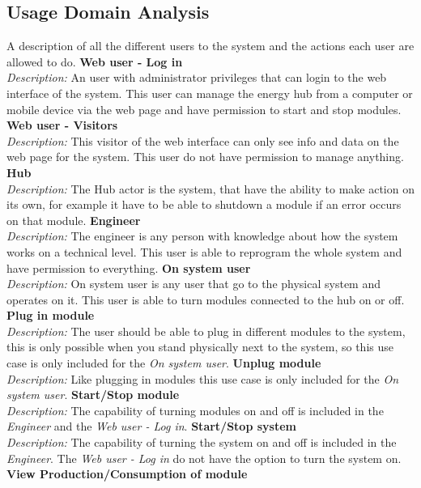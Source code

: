 \subsection{Usage Domain Analysis}
A description of all the different users to the system and the actions each user are allowed to do.
\p \textbf{Web user - Log in}
\\\textit{Description: }An user with administrator privileges that can login to the web interface of the system. This user can manage the energy hub from a computer or mobile device via the web page and have permission to start and stop modules.
\p\textbf{Web user - Visitors}
\\\textit{Description: }	This visitor of the web interface can only see info and data on the web page for the system. This user do not have permission to manage anything.
\p\textbf{Hub}
\\\textit{Description: }	The Hub actor is the system, that have the ability to make action on its own, for example it have to be able to shutdown a module if an error occurs on that module.
\p\textbf{Engineer}
\\\textit{Description: }The engineer is any person with knowledge about how the system works on a technical level. This user is able to reprogram the whole system and have permission to everything.
\p\textbf{On system user}
\\\textit{Description: }	On system user is any user that go to the physical system and operates on it. This user is able to turn modules connected to the hub on or off.
\p
\p\textbf{Plug in module}
\\\textit{Description: }	The user should be able to plug in different modules to the system, this is only possible when you stand physically next to the system, so this use case is only included for the \textit{On system user}.
\p\textbf{Unplug module}
\\\textit{Description: }Like plugging in modules this use case is only included for the \textit{On system user}.
\p\textbf{Start/Stop module}
\\\textit{Description: }The capability of turning modules on and off is included in the \textit{Engineer} and the \textit{Web user - Log in}.
\p\textbf{Start/Stop system}
\\\textit{Description: }The capability of turning the system on and off is included in the \textit{Engineer}. The \textit{Web user - Log in} do not have the option to turn the system on.
\p\textbf{View Production/Consumption of module}

